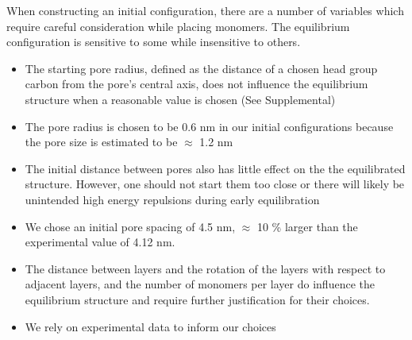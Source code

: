 \documentclass{article}
\begin{document}
  
  When constructing an initial configuration, there are a number of variables
  which require careful consideration while placing monomers. The equilibrium
  configuration is sensitive to some while insensitive to others.
  \begin{itemize}
	\item The starting pore radius, defined as the distance of a chosen 
        head group carbon from the pore's central axis, does not influence the
        equilibrium structure when a reasonable value is chosen (See Supplemental)
        \item The pore radius is chosen to be 0.6 nm in our initial configurations 
        because the pore size is estimated to be $\approx$ 1.2 nm %
	\item The initial distance between pores also has little effect on the 
        the equilibrated structure. However, one should not start them too close or there 
        will likely be unintended high energy repulsions during early equilibration
	\item We chose an initial pore spacing of 4.5 nm, $\approx$ 10 \% larger than 
        the experimental value of 4.12 nm.
        \item The distance between layers and the rotation of the layers with respect
        to adjacent layers, and the number of monomers per layer do influence the 
        equilibrium structure and require further justification for their choices. 
        \item We rely on experimental data to inform our choices
  \end{itemize}
\end{document}
